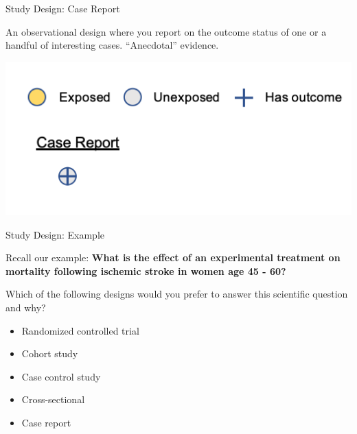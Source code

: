 \documentclass[ignorenonframetext,]{beamer}
\providecommand{\tightlist}{%
  \setlength{\itemsep}{0pt}\setlength{\parskip}{0pt}}
\begin{document}
\begin{frame}{Study Design: Case Report}
\protect\hypertarget{study-design-case-report}{}

An observational design where you report on the outcome status of one or
a handful of interesting cases. ``Anecdotal'' evidence.

\includegraphics{../media/study-design-case.png}

\end{frame}

\begin{frame}{Study Design: Example}
\protect\hypertarget{study-design-example}{}

Recall our example: \textbf{What is the effect of an experimental
treatment on mortality following ischemic stroke in women age 45 - 60?}

Which of the following designs would you prefer to answer this
scientific question and why?

\begin{itemize}
\tightlist
\item
  Randomized controlled trial
\item
  Cohort study
\item
  Case control study
\item
  Cross-sectional
\item
  Case report
\end{itemize}

\end{frame}
\end{document}
